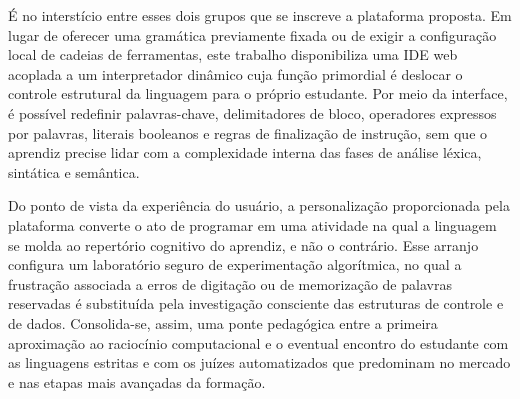 É no interstício entre esses dois grupos que se inscreve a plataforma proposta. Em lugar de oferecer uma gramática previamente fixada ou de exigir a configuração local de cadeias de ferramentas, este trabalho disponibiliza uma IDE web acoplada a um interpretador dinâmico cuja função primordial é deslocar o controle estrutural da linguagem para o próprio estudante. Por meio da interface, é possível redefinir palavras-chave, delimitadores de bloco, operadores expressos por palavras, literais booleanos e regras de finalização de instrução, sem que o aprendiz precise lidar com a complexidade interna das fases de análise léxica, sintática e semântica.

Do ponto de vista da experiência do usuário, a personalização proporcionada pela plataforma converte o ato de programar em uma atividade na qual a linguagem se molda ao repertório cognitivo do aprendiz, e não o contrário. Esse arranjo configura um laboratório seguro de experimentação algorítmica, no qual a frustração associada a erros de digitação ou de memorização de palavras reservadas é substituída pela investigação consciente das estruturas de controle e de dados. Consolida-se, assim, uma ponte pedagógica entre a primeira aproximação ao raciocínio computacional e o eventual encontro do estudante com as linguagens estritas e com os juízes automatizados que predominam no mercado e nas etapas mais avançadas da formação.


